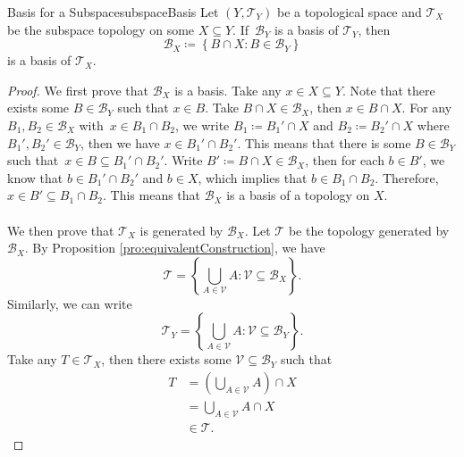 \documentclass[math, code]{amznotes}
\theoremstyle{remark}
\begin{document}
\begin{probox}{Basis for a Subspace}{subspaceBasis}
    Let $\left(Y, \mathcal{T}_Y\right)$ be a topological space and $\mathcal{T}_X$ be the subspace topology on some $X \subseteq Y$. If~$\mathcal{B}_Y$ is a basis of $\mathcal{T}_Y$, then 
    \begin{equation*}
        \mathcal{B}_X \coloneqq \left\{B \cap X \colon B \in \mathcal{B}_Y\right\}
    \end{equation*}
    is a basis of $\mathcal{T}_X$.
    \tcblower
    \begin{proof}
        We first prove that $\mathcal{B}_X$ is a basis. Take any $x \in X \subseteq Y$. Note that there exists some $B \in \mathcal{B}_Y$ such that $x \in B$. Take $B \cap X \in \mathcal{B}_X$, then $x \in B \cap X$. For any $B_1, B_2 \in \mathcal{B}_X$ with~$x \in B_1 \cap B_2$, we write $B_1 \coloneqq B_1' \cap X$ and $B_2 \coloneqq B_2' \cap X$ where $B_1', B_2' \in \mathcal{B}_Y$, then we have $x \in B_1' \cap B_2'$. This means that there is some $B \in \mathcal{B}_Y$ such that~$x \in B \subseteq B_1' \cap B_2'$. Write $B' \coloneqq B \cap X \in \mathcal{B}_X$, then for each $b \in B'$, we know that $b \in B_1' \cap B_2'$ and $b \in X$, which implies that $b \in B_1 \cap B_2$. Therefore, $x \in B' \subseteq B_1 \cap B_2$. This means that $\mathcal{B}_X$ is a basis of a topology on $X$. 
        \\\\
        We then prove that $\mathcal{T}_X$ is generated by $\mathcal{B}_X$. Let $\mathcal{T}$ be the topology generated by~$\mathcal{B}_X$. By Proposition \ref{pro:equivalentConstruction}, we have 
        \begin{equation*}
            \mathcal{T} = \left\{\bigcup_{A \in \mathcal{V}}A \colon \mathcal{V} \subseteq \mathcal{B}_X\right\}.
        \end{equation*}
        Similarly, we can write 
        \begin{equation*}
            \mathcal{T}_Y = \left\{\bigcup_{A \in \mathcal{V}}A \colon \mathcal{V} \subseteq \mathcal{B}_Y\right\}.
        \end{equation*}
        Take any $T \in \mathcal{T}_X$, then there exists some $\mathcal{V} \subseteq \mathcal{B}_Y$ such that
        \begin{align*}
            T & = \left(\bigcup_{A \in \mathcal{V}}A\right) \cap X \\
            & = \bigcup_{A \in \mathcal{V}}A \cap X \\
            & \in \mathcal{T}.

\end{align*}
\end{proof}
\end{probox}
\end{document}
